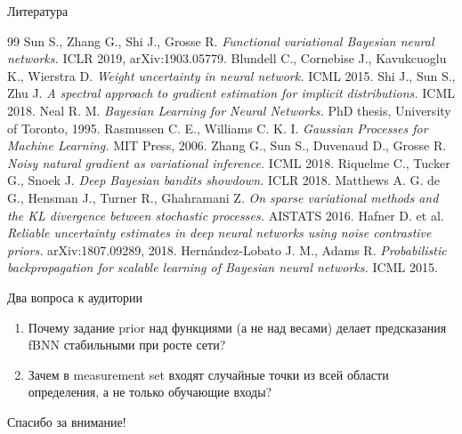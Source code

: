 \documentclass[aspectratio=169,9pt]{beamer}
\begin{document}
\begin{frame}{Литература}
  \footnotesize
  \begin{thebibliography}{99}
     Sun S., Zhang G., Shi J., Grosse R. \emph{Functional variational Bayesian neural networks.} ICLR 2019, arXiv:1903.05779.
     Blundell C., Cornebise J., Kavukcuoglu K., Wierstra D. \emph{Weight uncertainty in neural network.} ICML 2015.
     Shi J., Sun S., Zhu J. \emph{A spectral approach to gradient estimation for implicit distributions.} ICML 2018.
     Neal R. M. \emph{Bayesian Learning for Neural Networks.} PhD thesis, University of Toronto, 1995.
     Rasmussen C. E., Williams C. K. I. \emph{Gaussian Processes for Machine Learning.} MIT Press, 2006.
     Zhang G., Sun S., Duvenaud D., Grosse R. \emph{Noisy natural gradient as variational inference.} ICML 2018.
     Riquelme C., Tucker G., Snoek J. \emph{Deep Bayesian bandits showdown.} ICLR 2018.
     Matthews A. G. de G., Hensman J., Turner R., Ghahramani Z. \emph{On sparse variational methods and the KL divergence between stochastic processes.} AISTATS 2016.
     Hafner D. et al. \emph{Reliable uncertainty estimates in deep neural networks using noise contrastive priors.} arXiv:1807.09289, 2018.
     Hern\'andez-Lobato J. M., Adams R. \emph{Probabilistic backpropagation for scalable learning of Bayesian neural networks.} ICML 2015.
  \end{thebibliography}
\end{frame}

\begin{frame}{Два вопроса к аудитории}
  \begin{enumerate}
    \setlength{\itemsep}{1.2em}
    \item Почему задание prior над функциями (а не над весами) делает предсказания fBNN стабильными при росте сети?
    \item Зачем в measurement set входят случайные точки из всей области определения, а не только обучающие входы?
  \end{enumerate}
  \vfill
  \centering\Large Спасибо за внимание!
\end{frame}
\end{document}
